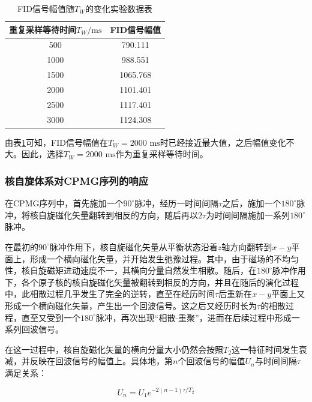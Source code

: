 \documentclass{thuemp}
\begin{document}
\begin{table}[H]
    \centering
    \captionnamefont{\wuhao\bf\heiti}
    \captiontitlefont{\wuhao\bf\heiti}
    \caption{FID信号幅值随$T_W$的变化实验数据表}
    \label{tab:fid_TW}
    \liuhao
    \begin{tabular}{cc}
        \toprule
        重复采样等待时间$T_W / \text{ms}$ & FID信号幅值\\
        \midrule
         500 & 790.111 \\
        1000 & 988.551 \\
        1500 & 1065.768 \\
        2000 & 1101.401 \\
        2500 & 1117.401 \\
        3000 & 1124.308 \\
        \bottomrule
    \end{tabular}
\end{table}

由表\ref{tab:fid_TW}可知，FID信号幅值在$T_W = 2000 \text{ ms}$时已经接近最大值，之后幅值变化不大。因此，选择$T_W = 2000 \text{ ms}$作为重复采样等待时间。

\subsubsection{核自旋体系对CPMG序列的响应}

在CPMG序列中，首先施加一个$90^\circ$脉冲，经历一时间间隔$\tau$之后，施加一个$180^\circ$脉冲，将核自旋磁化矢量翻转到相反的方向，随后再以$2\tau$为时间间隔施加一系列$180^\circ$脉冲。

在最初的$90^\circ$脉冲作用下，核自旋磁化矢量从平衡状态沿着$z$轴方向翻转到$x-y$平面上，形成一个横向磁化矢量，并开始发生弛豫过程。其中，由于磁场的不均匀性，核自旋磁矩进动速度不一，其横向分量自然发生相散。随后，在$180^\circ$脉冲作用下，各个原子核的核自旋磁化矢量被翻转到相反的方向，并且在随后的演化过程中，此相散过程几乎发生了完全的逆转，直至在经历时间$\tau$后重新在$x-y$平面上又形成一个横向磁化矢量，产生出一个回波信号。这之后又经历时长为$\tau$的相散过程，直至又受到一个$180^\circ$脉冲，再次出现“相散-重聚”，进而在后续过程中形成一系列回波信号。

在这一过程中，核自旋磁化矢量的横向分量大小仍然会按照$T_2$这一特征时间发生衰减，并反映在回波信号的幅值上。具体地，第$n$个回波信号的幅值$U_n$与时间间隔$\tau$满足关系：

\begin{equation}
U_n = U_1 e^{-2(n-1)\tau/T_2}
\label{eq:echo_amplitude}
\end{equation}
\end{document}
